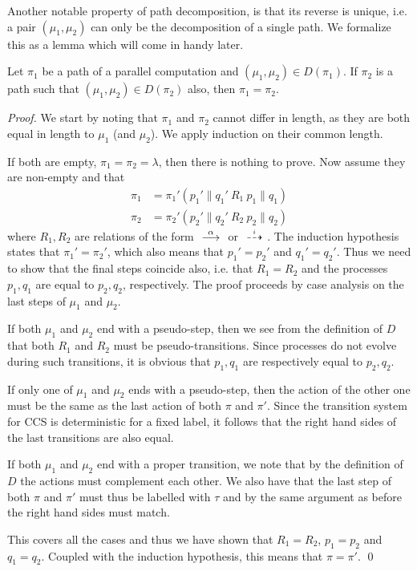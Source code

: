 Another notable property of path decomposition, is that its reverse is unique, i.e.
a pair $(\mu_1,\mu_2)$ can only be the decomposition of a single path. We formalize
this as a lemma which will come in handy later.
\begin{lemma}\label{thm:paths_compose_uniquely}
    Let $\pi_1$ be a path of a parallel computation and $(\mu_1,\mu_2)\in D(\pi_1)$. 
    If $\pi_2$ is a path such
    that $(\mu_1,\mu_2)\in D(\pi_2)$ also, then $\pi_1=\pi_2$.
\end{lemma}
\begin{proof}
    We start by noting that $\pi_1$ and $\pi_2$ cannot differ in length, as they
    are both equal in length to $\mu_1$ (and $\mu_2$). We apply induction on
    their common length.

    If both are empty, $\pi_1=\pi_2=\lambda$, then there is nothing to prove.
    Now assume they are non-empty and that
    \begin{align*}
        \pi_1 &= \pi_1' (p_1' \parallel q_1' \ R_1\  p_1 \parallel q_1) \\
        \pi_2 &= \pi_2' (p_2' \parallel q_2' \ R_2\  p_2 \parallel q_2)
    \end{align*}
    where $R_1,R_2$ are relations of the form $\ {\stackrel{{\alpha}}{\longrightarrow}}\ $ or $\ {\stackrel{_{i}}{\dashrightarrow}}\ $.
    The induction hypothesis states that $\pi_1' = \pi_2'$, which also means
    that $p_1'=p_2'$ and $q_1'=q_2'$. Thus we need to show
    that the final steps coincide also, i.e. that $R_1=R_2$ and the processes
    $p_1, q_1$ are equal to $p_2,q_2$, respectively.
    The proof proceeds by case analysis on the last steps of $\mu_1$ and $\mu_2$.

    If both $\mu_1$ and $\mu_2$ end with a pseudo-step, then we see from the definition
    of $D$ that both $R_1$ and $R_2$ must be pseudo-transitions. Since processes do
    not evolve during such transitions, it is obvious that $p_1,q_1$ are respectively
    equal to $p_2,q_2$.

    If only one of $\mu_1$ and $\mu_2$ ends with a pseudo-step, then the action
    of the other one must be the same as the last action of both $\pi$ and $\pi'$.
    Since the transition system for CCS is deterministic for a fixed label, it
    follows that the right hand sides of the last transitions are also equal.

    If both $\mu_1$ and $\mu_2$ end with a proper transition, we note that by
    the definition of $D$ the actions must complement each other. We also have
    that the last step of both $\pi$ and $\pi'$ must thus be labelled with $\tau$
    and by the same argument as before the right hand sides must match.

    This covers all the cases and thus we have shown that $R_1=R_2$, $p_1=p_2$
    and $q_1=q_2$. Coupled with the induction hypothesis, this means that $\pi=\pi'$.
\qed\end{proof}

